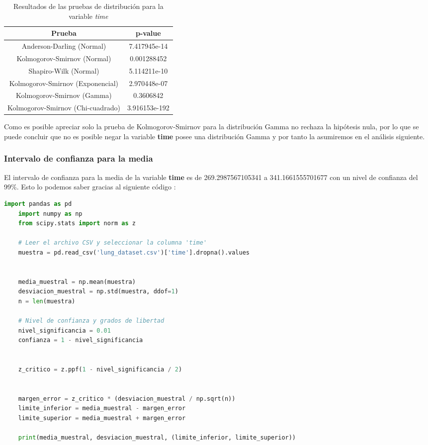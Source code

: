 \documentclass[a4paper,12pt]{article}
\begin{document}
\begin{table}[h!]
    \centering
    \begin{tabular}{|c|c|}
        \hline
        \textbf{Prueba} & \textbf{p-value} \\
        \hline
        Anderson-Darling (Normal) & 7.417945e-14 \\
        \hline
        Kolmogorov-Smirnov (Normal) & 0.001288452 \\
        \hline
        Shapiro-Wilk (Normal) & 5.114211e-10 \\
        \hline
        Kolmogorov-Smirnov (Exponencial) & 2.970448e-07 \\
        \hline
        Kolmogorov-Smirnov (Gamma) & 0.3606842 \\
        \hline
        Kolmogorov-Smirnov (Chi-cuadrado) & 3.916153e-192 \\
        \hline
    \end{tabular}
    \caption{Resultados de las pruebas de distribución para la variable \textit{time}}
    \label{tab:pruebas_distribucion}
\end{table}

Como es posible apreciar solo la prueba de Kolmogorov-Smirnov para la distribución Gamma no rechaza la hipótesis nula, por lo que se puede concluir que no es posible negar la variable \textbf{time} posee una distribución Gamma y por tanto la asumiremos en el análisis siguiente.

\subsubsection*{Intervalo de confianza para la media}

El intervalo de confianza para la media de la variable \textbf{time} es de 269.2987567105341 a 341.1661555701677 con un nivel de confianza del 99\%. Esto lo podemos saber gracias al siguiente código :

\begin{lstlisting}[language=Python, caption={Código en Python para calcular el intervalo de confianza},label={lst:intervalo_confianza_normal}]
    import pandas as pd
    import numpy as np
    from scipy.stats import norm as z
    
    # Leer el archivo CSV y seleccionar la columna 'time'
    muestra = pd.read_csv('lung_dataset.csv')['time'].dropna().values
    
    
    media_muestral = np.mean(muestra)
    desviacion_muestral = np.std(muestra, ddof=1)
    n = len(muestra)
    
    # Nivel de confianza y grados de libertad
    nivel_significancia = 0.01
    confianza = 1 - nivel_significancia
    

    z_critico = z.ppf(1 - nivel_significancia / 2)
    
    
    margen_error = z_critico * (desviacion_muestral / np.sqrt(n))
    limite_inferior = media_muestral - margen_error
    limite_superior = media_muestral + margen_error
    
    print(media_muestral, desviacion_muestral, (limite_inferior, limite_superior))
    \end{lstlisting}
\end{document}
